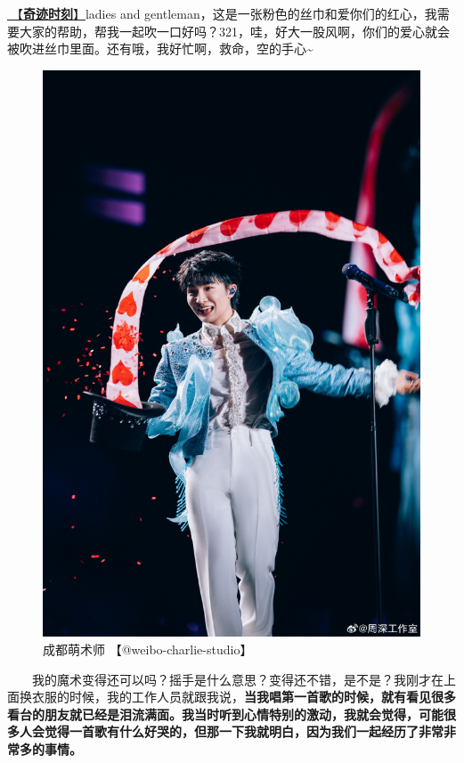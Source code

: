 \documentclass[]{ctexbook}
\begin{document}
\hyperref[magic-moment]{🎵【\textbf{奇迹时刻}】}ladies and gentleman，这是一张粉色的丝巾和爱你们的红心，我需要大家的帮助，帮我一起吹一口好吗？321，哇，好大一股风啊，你们的爱心就会被吹进丝巾里面。还有哦，我好忙啊，救命，空的手心\textasciitilde{}

\begin{figure}

{\centering \includegraphics[width=440pt]{img/chengdu20240615/001} 

}

\caption{成都萌术师 【@weibo-charlie-studio】}\label{fig:unnamed-chunk-55}
\end{figure}

  我的魔术变得还可以吗？摇手是什么意思？变得还不错，是不是？我刚才在上面换衣服的时候，我的工作人员就跟我说，\textbf{当我唱第一首歌的时候，就有看见很多看台的朋友就已经是泪流满面。我当时听到心情特别的激动，我就会觉得，可能很多人会觉得一首歌有什么好哭的，但那一下我就明白，因为我们一起经历了非常非常多的事情。}
\end{document}
